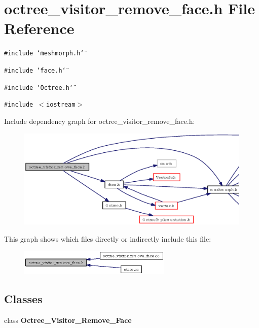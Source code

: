\section{octree\_\-visitor\_\-remove\_\-face.h File Reference}
\label{octree__visitor__remove__face_8h}
{\tt \#include \char`\"{}meshmorph.h\char`\"{}}\par
{\tt \#include \char`\"{}face.h\char`\"{}}\par
{\tt \#include \char`\"{}Octree.h\char`\"{}}\par
{\tt \#include $<$iostream$>$}\par


Include dependency graph for octree\_\-visitor\_\-remove\_\-face.h:\begin{figure}[H]
\begin{center}
\leavevmode
\includegraphics[width=364pt]{octree__visitor__remove__face_8h__incl}
\end{center}
\end{figure}


This graph shows which files directly or indirectly include this file:\begin{figure}[H]
\begin{center}
\leavevmode
\includegraphics[width=207pt]{octree__visitor__remove__face_8h__dep__incl}
\end{center}
\end{figure}
\subsection*{Classes}
\begin{CompactItemize}
\item 
class {\bf Octree\_\-Visitor\_\-Remove\_\-Face}
\end{CompactItemize}
